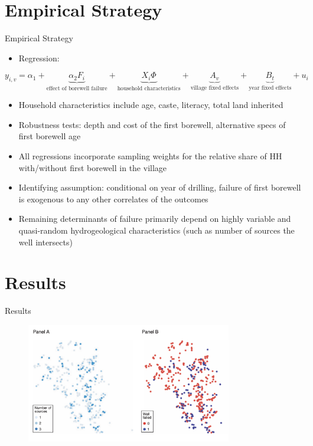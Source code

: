 \documentclass[10pt]{beamer}
\begin{document}
\section{Empirical Strategy}
\begin{frame}
	{Empirical Strategy}
	\begin{itemize}
		\item Regression:
	\end{itemize}
	\begin{equation}
		y_{i,v} = \alpha_1 + \underbrace{\alpha_2 F_i}_{\text{effect of borewell failure}} + \underbrace{X_i \Phi}_{\text{household characteristics}} + \underbrace{A_v}_{\text{village fixed effects}} + \underbrace{B_t}_{\text{year fixed effects}} + u_i
	\end{equation}
	\begin{itemize}
		\item Household characteristics include age, caste, literacy, total land inherited
		\item Robustness tests: depth and cost of the first borewell, alternative specs of first borewell age
		\item All regressions incorporate sampling weights for the relative share of HH with/without first borewell in the village
		\item Identifying assumption: conditional on year of drilling, failure of first borewell is exogenous to any other correlates of the outcomes
		\item Remaining determinants of failure primarily depend on highly variable and quasi-random hydrogeological characteristics (such as number of sources the well intersects)
	\end{itemize}
\end{frame}


\section{Results}
\begin{frame}
	{Results}
	\begin{figure}
		\centering
		\includegraphics[width=0.8\textwidth]{figure3.png}
	\end{figure}
\end{frame}
\end{document}
